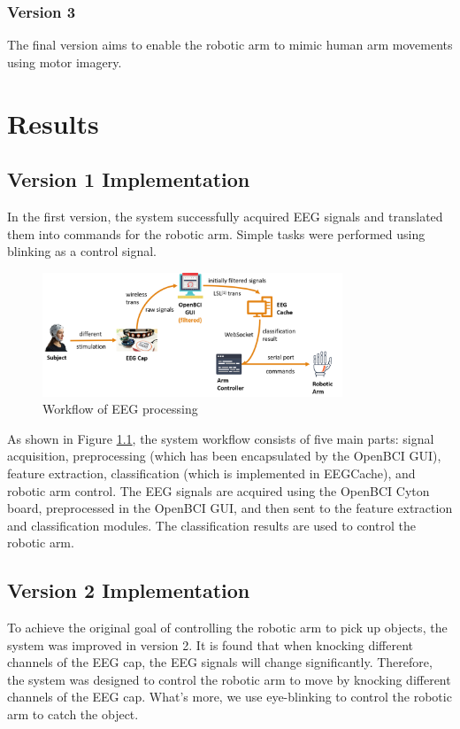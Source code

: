 \documentclass[12pt]{report}
\begin{document}
\subsection{Version 3}
The final version aims to enable the robotic arm to mimic human arm movements using motor imagery.


\chapter{Results}
\section{Version 1 Implementation}
In the first version, the system successfully acquired EEG signals and translated them into commands for the robotic arm. Simple tasks were performed using blinking as a control signal.

\begin{figure}[h]
    \centering
    \includegraphics[width=0.8\textwidth]{../imgs/workflow.png}
    \caption{Workflow of EEG processing}
    \label{fig:workflow}
\end{figure}

As shown in Figure \ref{fig:workflow}, the system workflow consists of five main parts: signal acquisition, preprocessing 
(which has been encapsulated by the OpenBCI GUI), feature extraction, classification (which is implemented in EEGCache), and robotic arm control. 
The EEG signals are acquired using the OpenBCI Cyton board, preprocessed in the OpenBCI GUI, and then sent to the feature extraction and classification modules. 
The classification results are used to control the robotic arm. 

\section{Version 2 Implementation}
To achieve the original goal of controlling the robotic arm to pick up objects, the system was improved in version 2. 
It is found that when knocking different channels of the EEG cap, the EEG signals will change significantly. 
Therefore, the system was designed to control the robotic arm to move by knocking different channels of the EEG cap. 
What's more, we use eye-blinking to control the robotic arm to catch the object.
\end{document}
